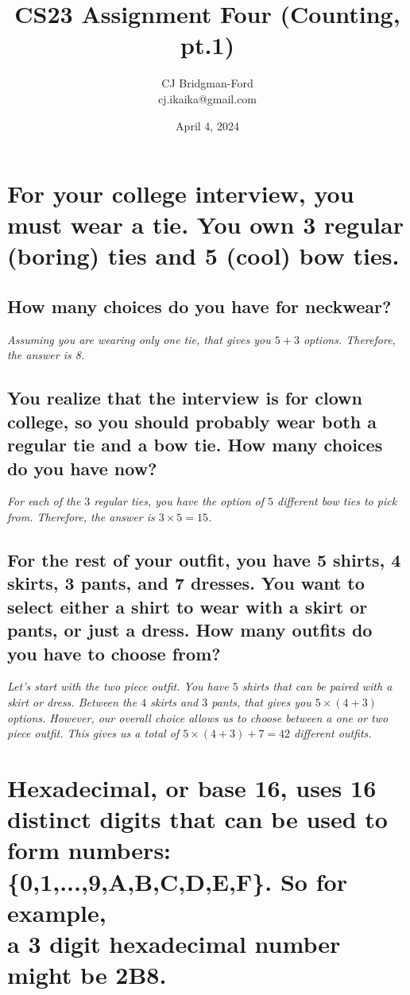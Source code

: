 \documentclass{article}
\title{CS23 Assignment Four (Counting, pt.1)}
\author{CJ Bridgman-Ford \\ cj.ikaika@gmail.com}
\date{April 4, 2024}
\begin{document}
\maketitle
\thispagestyle{empty}


\clearpage

\section{For your college interview, you must wear a tie.
 You own 3 regular (boring) ties and 5 (cool) bow ties.}
\subsection{How many choices do you have for neckwear?} 
\hspace{1cm}\textit{Assuming you are wearing only one tie, that gives you $5+3$ options.
 Therefore, the answer is 8.}
\subsection{You realize that the interview is for clown college,
 so you should probably wear both a regular tie and a bow tie. How many choices do you have now?}
 \hspace{1cm}\textit{For each of the $3$ regular ties, you have the option of $5$ different bow ties
  to pick from. Therefore, the answer is $3 \times 5 = 15$.}
\subsection{For the rest of your outfit, you have 5 shirts, 4 skirts, 3 pants, and 7 dresses.
 You want to select either a shirt to wear with a skirt or pants, or just a dress.
 How many outfits do you have to choose from?}
\hspace{1cm}\textit{Let's start with the two piece outfit. You have $5$ shirts that can be paired
 with a skirt or dress. Between the $4$ skirts and $3$ pants, that gives you $5\times(4+3)$ options.
 However, our overall choice allows us to choose between a one or two piece outfit. This gives us a
 total of $5\times(4+3)+7 = 42$ different outfits.}
\clearpage

\section{Hexadecimal, or base 16, uses 16 distinct digits that can be used to form numbers:
\\ \{0,1,...,9,A,B,C,D,E,F\}. So for example, \\ a 3 digit hexadecimal number might be 2B8.}
\end{document}
